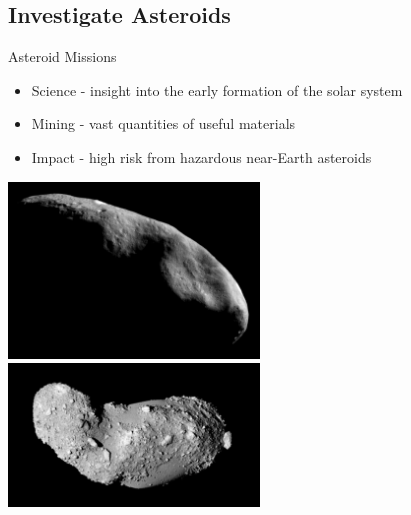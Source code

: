 \subsection*{Investigate Asteroids}

\begin{frame}{Asteroid Missions}
\begin{itemize}
    \item Science - insight into the early formation of the solar system
    \item Mining - vast quantities of useful materials
    \item Impact - high risk from hazardous near-Earth asteroids
\end{itemize}    

\begin{center}
    \includegraphics[height=0.38\textheight,width=0.5\textwidth,keepaspectratio]{figures/2016AAS/near_mos_20001203_full.jpg}
    ~
    \includegraphics[height=0.38\textheight,width=0.5\textwidth,keepaspectratio]{figures/2016AAS/Itokawa8_hayabusa_1210.jpg}
\end{center}
\end{frame}

